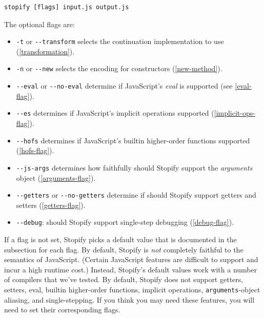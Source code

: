 \documentclass[10pt]{book}
\begin{document}
\begin{lstlisting}
stopify [flags] input.js output.js
\end{lstlisting}

The optional flags are:
\begin{itemize}

  \item \lstinline|-t| or \lstinline|--transform| selects the continuation implementation
  to use (\cref{transformation}).

  \item \lstinline|-n| or \lstinline|--new| selects the encoding for constructors (\cref{new-method}).

  \item \lstinline|--eval| or \lstinline|--no-eval| determine if JavaScript's \emph{eval} is supported
  (see \cref{eval-flag}).

  \item \lstinline|--es| determines if JavaScript's implicit operations supported (\cref{implicit-ops-flag}).

  \item \lstinline|--hofs| determines if JavaScript's builtin higher-order functions supported (\cref{hofs-flag}).

  \item \lstinline|--js-args| determines how faithfully should Stopify support the \emph{arguments} object (\cref{arguments-flag}).

  \item \lstinline|--getters| or \lstinline|--no-getters| determine if should Stopify support getters and setters (\cref{getters-flag}).

  \item \lstinline|--debug|: should Stopify support single-step debugging (\cref{debug-flag}).
\end{itemize}

If a flag is not set, Stopify picks a default value that is documented
in the subsection for each flag. By default, Stopify is \emph{not} completely
faithful to the semantics of JavaScript. (Certain JavaScript features are
difficult to support and incur a high runtime cost.) Instead, Stopify's default
values work with a number of compilers that we've tested. By default,
Stopify does not support getters, setters, eval, builtin higher-order
functions, implicit operations, \lstinline|arguments|-object aliasing,
and single-stepping.
If you think you may need these features, you will
need to set their corresponding flags.
\end{document}

